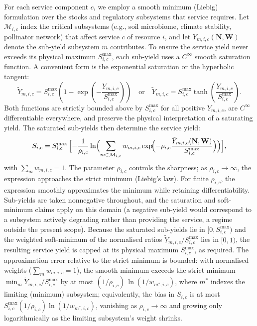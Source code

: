 \documentclass[twocolumn,10pt]{article}
\begin{document}
For each service component \(c\), we employ a smooth minimum (Liebig) formulation over the stocks and regulatory subsystems that service requires. Let \(\mathcal{M}_{i,c}\) index the critical subsystems (e.g., soil microbiome, climate stability, pollinator network) that affect service \(c\) of resource \(i\), and let \(Y_{m,i,c}(\mathbf{N},\mathbf{W})\) denote the sub-yield subsystem \(m\) contributes. To ensure the service yield never exceeds its physical maximum \(S_{i,c}^{\max}\), each sub-yield uses a \(C^\infty\) smooth saturation function. A convenient form is the exponential saturation or the hyperbolic tangent:
\[
\tilde{Y}_{m,i,c} = S_{i,c}^{\max} \left( 1 - \exp\left(-\frac{Y_{m,i,c}}{S_{i,c}^{\max}}\right) \right)
\quad \text{or} \quad
\tilde{Y}_{m,i,c} = S_{i,c}^{\max} \tanh\left(\frac{Y_{m,i,c}}{S_{i,c}^{\max}}\right).
\]
Both functions are strictly bounded above by \(S_{i,c}^{\max}\) for all positive \(Y_{m,i,c}\), are \(C^\infty\) differentiable everywhere, and preserve the physical interpretation of a saturating yield. The saturated sub-yields then determine the service yield:
\[
S_{i,c} = S_{i,c}^{\max}\,
\Bigl[-\frac{1}{\rho_{i,c}}\ln\Bigl(\sum_{m\in\mathcal{M}_{i,c}} w_{m,i,c}
\exp\!\Bigl(-\rho_{i,c} \frac{\tilde{Y}_{m,i,c}(\mathbf{N},\mathbf{W})}{S_{i,c}^{\max}}\Bigr)\Bigr)\Bigr],
\]
with \(\sum_m w_{m,i,c} = 1\). The parameter \(\rho_{i,c}\) controls the sharpness; as \(\rho_{i,c}\to\infty\), the expression approaches the strict minimum (Liebig's law). For finite \(\rho_{i,c}\), the expression smoothly approximates the minimum while retaining differentiability. Sub-yields are taken nonnegative throughout, and the saturation and soft-minimum claims apply on this domain (a negative sub-yield would correspond to a subsystem actively degrading rather than providing the service, a regime outside the present scope). Because the saturated sub-yields lie in \([0,S_{i,c}^{\max})\) and the weighted soft-minimum of the normalised ratios \(\tilde Y_{m,i,c}/S_{i,c}^{\max}\) lies in \([0,1)\), the resulting service yield is capped at its physical maximum \(S_{i,c}^{\max}\), as required. The approximation error relative to the strict minimum is bounded: with normalised weights (\(\sum_m w_{m,i,c}=1\)), the smooth minimum exceeds the strict minimum \(\min_m \tilde Y_{m,i,c}/S_{i,c}^{\max}\) by at most \((1/\rho_{i,c})\,\ln(1/w_{m^*,i,c})\), where \(m^*\) indexes the limiting (minimum) subsystem; equivalently, the bias in \(S_{i,c}\) is at most \(S_{i,c}^{\max}(1/\rho_{i,c})\ln(1/w_{m^*,i,c})\), vanishing as \(\rho_{i,c}\to\infty\) and growing only logarithmically as the limiting subsystem's weight shrinks.
\end{document}
